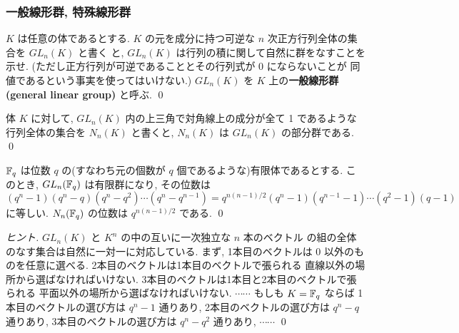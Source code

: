 \documentclass[12pt,twoside]{jarticle}
\begin{document}

\subsubsection{一般線形群, 特殊線形群}


\begin{question}[一般線形群]
 $K$ は任意の体であるとする.
 $K$ の元を成分に持つ可逆な $n$ 次正方行列全体の集合を $GL_n(K)$ と書く
 と, $GL_n(K)$ は行列の積に関して自然に群をなすことを示せ.
 (ただし正方行列が可逆であることとその行列式が $0$ にならないことが
 同値であるという事実を使ってはいけない.)
 $GL_n(K)$ を $K$ 上の{\bf 一般線形群 (general linear group)} と呼ぶ.
 \qed
\end{question}


\begin{question}[三角行列のなす群]
  体 $K$ に対して, $GL_n(K)$ 内の上三角で対角線上の成分が全て 1 であるような
  行列全体の集合を $N_n(K)$ と書くと, $N_n(K)$ は $GL_n(K)$ の部分群である.
  \qed
\end{question}


\begin{question}[有限体上の一般線形群の位数, 20点]
  ${\mathbb F}_q$ は位数 $q$ の(すなわち元の個数が $q$ 個であるような)有限体であるとする.
  このとき, $GL_n({\mathbb F}_q)$ は有限群になり, その位数は
  \begin{equation*}
    (q^n-1)(q^n-q)(q^n-q^2)\cdots(q^n-q^{n-1})
    =q^{n(n-1)/2} (q^n-1)(q^{n-1}-1)\cdots(q^2-1)(q-1)
  \end{equation*}
  に等しい. $N_n({\mathbb F}_q)$ の位数は $q^{n(n-1)/2}$ である.
  \qed
\end{question}

\begin{proof}[ヒント]
$GL_n(K)$ と $K^n$ の中の互いに一次独立な $n$ 本のベクトル
の組の全体のなす集合は自然に一対一に対応している. まず, 1本目のベクトルは
$0$ 以外のものを任意に選べる. 2本目のベクトルは1本目のベクトルで張られる
直線以外の場所から選ばなければいけない. 
3本目のベクトルは1本目と2本目のベクトルで張られる
平面以外の場所から選ばなければいけない. $\cdots\cdots$
もしも $K={\mathbb F}_q$ ならば
1本目のベクトルの選び方は $q^n-1$ 通りあり, 
2本目のベクトルの選び方は $q^n-q$ 通りあり, 
3本目のベクトルの選び方は $q^n-q^2$ 通りあり, 
$\cdots\cdots$
\qed
\end{proof}
\end{document}
